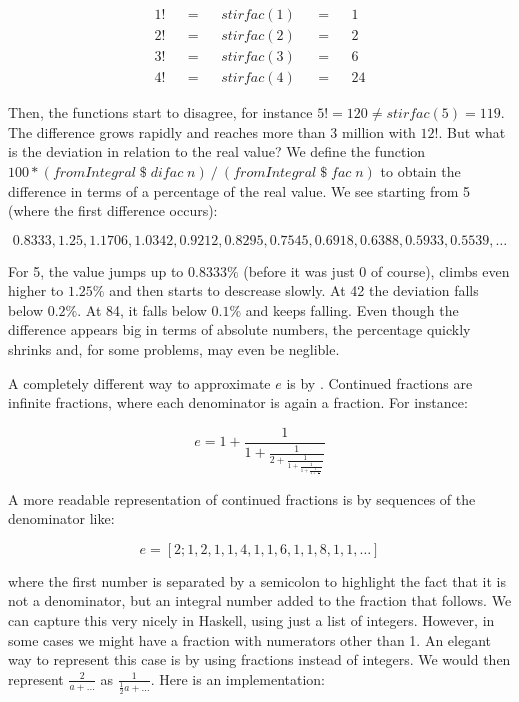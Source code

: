 \documentclass[tikz]{scrreprt}
\newcommand{\Varid}[1]{\mathit{#1}}
\begin{document}
\begin{align*}
1! && = && stirfac(1) && = && 1\\
2! && = && stirfac(2) && = && 2\\
3! && = && stirfac(3) && = && 6\\
4! && = && stirfac(4) && = && 24
\end{align*}

Then, the functions start to disagree,
for instance $5! = 120 \neq stirfac(5) = 119$.
The difference grows rapidly and reaches more
than 3 million with $12!$. But what is the deviation
in relation to the real value?
We define the function 
\ensuremath{\mathrm{100}\mathbin{*}(\Varid{fromIntegral}\mathbin{\$}\Varid{difac}\;\Varid{n})\mathbin{/}(\Varid{fromIntegral}\mathbin{\$}\Varid{fac}\;\Varid{n})}
to obtain the difference in terms of a percentage
of the real value. We see starting from 5
(where the first difference occurs):

\[
0.8333,
1.25,
1.1706,
1.0342,
0.9212,
0.8295,
0.7545,
0.6918,
0.6388,
0.5933,
0.5539,\dots
\]

For 5, the value jumps up to $0.8333\%$
(before it was just 0 of course),
climbs even higher to $1.25\%$ and then starts
to descrease slowly.
At 42 the deviation falls below $0.2\%$.
At 84, it falls below $0.1\%$ and keeps falling.
Even though the difference appears big
in terms of absolute numbers, the percentage
quickly shrinks and, for some problems, may
even be neglible.

A completely different way to approximate $e$
is by .
Continued fractions are infinite fractions,
where each denominator is again a fraction.
For instance:

\begin{equation}
  e =  1 + \frac{1}{
         1 + \frac{1}{
           2 + \frac{1}{
             1 + \frac{1}{
               1 + \frac{1}{
                 4 + \frac{1}{\dots}}}}}}
\end{equation}

A more readable representation of continued fractions
is by sequences of the denominator like:

\begin{equation}
e = [2;1,2,1,1,4,1,1,6,1,1,8,1,1,\dots]
\end{equation}

where the first number is separated by a semicolon
to highlight the fact that it is not a denominator,
but an integral number added to the fraction that follows.
We can capture this very nicely in Haskell,
using just a list of integers.
However, in some cases we might have a fraction
with numerators other than 1.
An elegant way to represent this case is by
using fractions instead of integers.
We would then represent $\frac{2}{a + \dots}$
as $\frac{1}{\frac{1}{2}a + \dots}$.
Here is an implementation:
\end{document}
